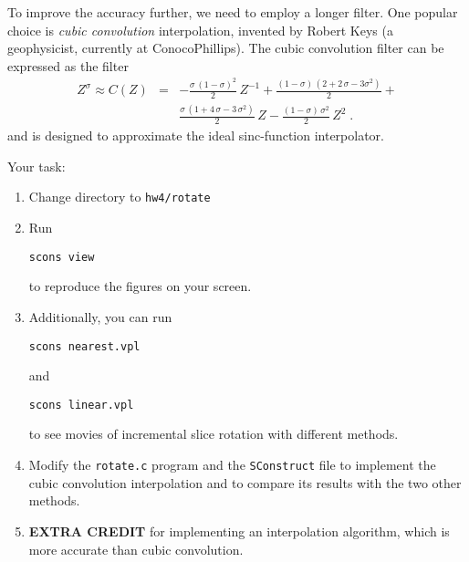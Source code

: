 To improve the accuracy further, we need to employ a longer
filter. One popular choice is \emph{cubic convolution} interpolation,
invented by Robert Keys (a geophysicist, currently at ConocoPhillips).
The cubic convolution filter can be expressed as the
filter \cite[]{keys}
\begin{eqnarray}
\nonumber
Z^{\sigma} \approx C(Z) & = & -\frac{\sigma\,(1-\sigma)^2}{2}\,Z^{-1} + 
\frac{(1-\sigma)\,(2 + 2\,\sigma - 3 \sigma^2)}{2} + \\
&  & \frac{\sigma\,(1 + 4\,\sigma - 3\,\sigma^2)}{2}\,Z - \frac{(1-\sigma)\,\sigma^2}{2}\,Z^2\;.
\label{eq:cubic}
\end{eqnarray}
and is designed to approximate the ideal sinc-function interpolator.


\lstset{language=c,numbers=left,numberstyle=\tiny,showstringspaces=false}


\lstset{language=python,numbers=left,numberstyle=\tiny,showstringspaces=false}


Your task:
\begin{enumerate}
\item Change directory to \texttt{hw4/rotate}
\item Run 
\begin{verbatim}
scons view
\end{verbatim}
to reproduce the figures on your screen.
\item Additionally, you can run
\begin{verbatim}
scons nearest.vpl
\end{verbatim}
and
\begin{verbatim}
scons linear.vpl
\end{verbatim}
to see movies of incremental slice rotation with different methods.
\item Modify the \texttt{rotate.c} program and the \texttt{SConstruct} file to implement 
the cubic convolution interpolation and to compare 
its results with the two other methods.
\item \textbf{EXTRA CREDIT} for implementing an interpolation algorithm, which 
is more accurate than cubic convolution.
\end{enumerate}

